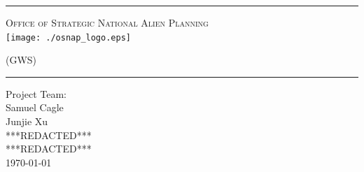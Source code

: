 \begin{titlepage}
\begin{center}

\rule{\linewidth}{0.5mm}

\textsc{\large Office of Strategic National Alien Planning}
~\\[1cm]
\texttt{[image: ./osnap\_logo.eps]}~\\[1cm]

{\Huge \linespread{2}}

\vspace{10pt}

\textsc{\Large (GWS)}

\rule{\linewidth}{0.5mm}

\vfill

Project Team:\\
Samuel Cagle\\
Junjie Xu\\
***REDACTED***\\
***REDACTED***\\

\vfill
{\large \today}

\end{center}
\end{titlepage}
